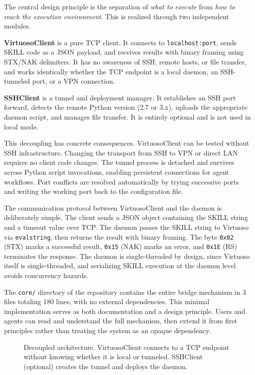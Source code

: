 \documentclass[lettersize,journal]{ieee_template/IEEEtran}
\begin{document}
The central design principle is the separation of \emph{what to execute} from \emph{how to reach the execution environment}. This is realized through two independent modules.

\textbf{VirtuosoClient} is a pure TCP client. It connects to \texttt{localhost:port}, sends SKILL code as a JSON payload, and receives results with binary framing using STX/NAK delimiters. It has no awareness of SSH, remote hosts, or file transfer, and works identically whether the TCP endpoint is a local daemon, an SSH-tunneled port, or a VPN connection.

\textbf{SSHClient} is a tunnel and deployment manager. It establishes an SSH port forward, detects the remote Python version (2.7 or 3.x), uploads the appropriate daemon script, and manages file transfer. It is entirely optional and is not used in local mode.

This decoupling has concrete consequences. VirtuosoClient can be tested without SSH infrastructure. Changing the transport from SSH to VPN or direct LAN requires no client code changes. The tunnel process is detached and survives across Python script invocations, enabling persistent connections for agent workflows. Port conflicts are resolved automatically by trying successive ports and writing the working port back to the configuration file.

The communication protocol between VirtuosoClient and the daemon is deliberately simple. The client sends a JSON object containing the SKILL string and a timeout value over TCP. The daemon passes the SKILL string to Virtuoso via \texttt{evalstring}, then returns the result with binary framing. The byte \texttt{0x02} (STX) marks a successful result, \texttt{0x15} (NAK) marks an error, and \texttt{0x1E} (RS) terminates the response. The daemon is single-threaded by design, since Virtuoso itself is single-threaded, and serializing SKILL execution at the daemon level avoids concurrency hazards.

The \texttt{core/} directory of the repository contains the entire bridge mechanism in 3 files totaling 180 lines, with no external dependencies. This minimal implementation serves as both documentation and a design principle. Users and agents can read and understand the full mechanism, then extend it from first principles rather than treating the system as an opaque dependency.

\begin{figure}[!t]
\centering
\caption{Decoupled architecture. VirtuosoClient connects to a TCP endpoint without knowing whether it is local or tunneled. SSHClient (optional) creates the tunnel and deploys the daemon.}
\label{fig:architecture}
\end{figure}
\end{document}
